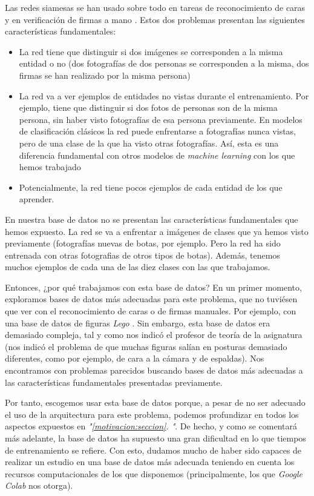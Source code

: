 \documentclass[11pt]{article}
\newcommand{\customcite}[1]{\emph{"\ref{#1}. \nameref{#1}"}}
\begin{document}
Las redes siamesas se han usado sobre todo en tareas de reconocimiento de caras y en verificación de firmas a mano \cite{siamese_wikipedia:online}. Estos dos problemas presentan las siguientes características fundamentales:

\begin{itemize}
  \item La red tiene que distinguir si dos imágenes se corresponden a la misma entidad o no (dos fotografías de dos personas se corresponden a la misma, dos firmas se han realizado por la misma persona)
  \item La red va a ver ejemplos de entidades no vistas durante el entrenamiento. Por ejemplo, tiene que distinguir si dos fotos de personas son de la misma persona, sin haber visto fotografías de esa persona previamente. En modelos de clasificación clásicos la red puede enfrentarse a fotografías nunca vistas, pero de una clase de la que ha visto otras fotografías. Así, esta es una diferencia fundamental con otros modelos de \emph{machine learning} con los que hemos trabajado 
  \item Potencialmente, la red tiene pocos ejemplos de cada entidad de los que aprender. 
\end{itemize}

En nuestra base de datos no se presentan las características fundamentales que hemos expuesto. La red se va a enfrentar a imágenes de clases que ya hemos visto previamente (fotografías nuevas de botas, por ejemplo. Pero la red ha sido entrenada con otras fotografias de otros tipos de botas). Además, tenemos muchos ejemplos de cada una de las diez clases con las que trabajamos.

Entonces, ¿por qué trabajamos con esta base de datos? En un primer momento, exploramos bases de datos más adecuadas para este problema, que no tuviésen que ver con el reconocimiento de caras o de firmas manuales. Por ejemplo, con una base de datos de figuras \emph{Lego} \cite{lego_database:online}. Sin embargo, esta base de datos era demasiado compleja, tal y como nos indicó el profesor de teoría de la asignatura (nos indicó el problema de que muchas figuras salían en posturas demasiado diferentes, como por ejemplo, de cara a la cámara y de espaldas). Nos encontramos con problemas parecidos buscando bases de datos más adecuadas a las características fundamentales presentadas previamente.

Por tanto, escogemos usar esta base de datos porque, a pesar de no ser adecuado el uso de la arquitectura para este problema, podemos profundizar en todos los aspectos expuestos en \customcite{motivacion:seccion}. De hecho, y como se comentará más adelante, la base de datos ha supuesto una gran dificultad en lo que tiempos de entrenamiento se refiere. Con esto, dudamos mucho de haber sido capaces de realizar un estudio en una base de datos más adecuada teniendo en cuenta los recursos computacionales de los que disponemos (principalmente, los que \emph{Google Colab} nos otorga).
\end{document}
